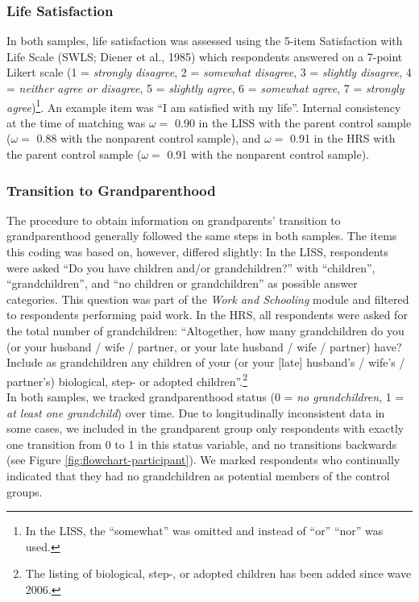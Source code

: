 \documentclass[
  english,
  man, noextraspace]{apa7}
\begin{document}
\hypertarget{life-satisfaction}{%
\subsubsection{Life Satisfaction}\label{life-satisfaction}}

In both samples, life satisfaction was assessed using the 5-item Satisfaction with Life Scale (SWLS; Diener et al., 1985) which respondents answered on a 7-point Likert scale (1 = \emph{strongly disagree}, 2 = \emph{somewhat disagree}, 3 = \emph{slightly disagree}, 4 = \emph{neither agree or disagree}, 5 = \emph{slightly agree}, 6 = \emph{somewhat agree}, 7 = \emph{strongly agree})\footnote{In the LISS, the \enquote{somewhat} was omitted and instead of \enquote{or} \enquote{nor} was used.}. An example item was \enquote{I am satisfied with my life}. Internal consistency at the time of matching was \(\omega =\) 0.90 in the LISS with the parent control sample (\(\omega =\) 0.88 with the nonparent control sample), and \(\omega =\) 0.91 in the HRS with the parent control sample (\(\omega =\) 0.91 with the nonparent control sample).

\hypertarget{transition-to-grandparenthood}{%
\subsubsection{Transition to Grandparenthood}\label{transition-to-grandparenthood}}

The procedure to obtain information on grandparents' transition to grandparenthood generally followed the same steps in both samples. The items this coding was based on, however, differed slightly: In the LISS, respondents were asked \enquote{Do you have children and/or grandchildren?} with \enquote{children}, \enquote{grandchildren}, and \enquote{no children or grandchildren} as possible answer categories. This question was part of the \emph{Work and Schooling} module and filtered to respondents performing paid work. In the HRS, all respondents were asked for the total number of grandchildren: \enquote{Altogether, how many grandchildren do you (or your husband / wife / partner, or your late husband / wife / partner) have? Include as grandchildren any children of your (or your {[}late{]} husband's / wife's / partner's) biological, step- or adopted children}.\footnote{The listing of biological, step-, or adopted children has been added since wave 2006.}\\
In both samples, we tracked grandparenthood status (0 = \emph{no grandchildren}, 1 = \emph{at least one grandchild}) over time. Due to longitudinally inconsistent data in some cases, we included in the grandparent group only respondents with exactly one transition from 0 to 1 in this status variable, and no transitions backwards (see Figure \ref{fig:flowchart-participant}). We marked respondents who continually indicated that they had no grandchildren as potential members of the control groups.
\end{document}
